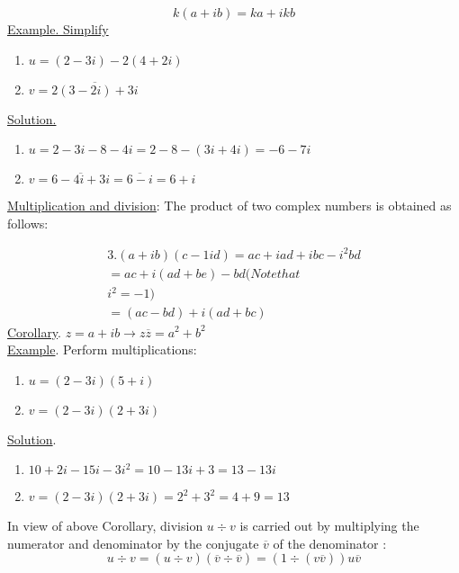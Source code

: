 \documentclass{book}
\begin{document}
\[
    k(a+ib) = ka+ikb
\]
\underline{Example. Simplify}

\begin{enumerate}
    \item 
    
    $    u = (2 - 3i) - 2(4 + 2i)    $
    
    \item
     
    $    v = \overline{2(3 - 2i) + 3i} $
        
\end{enumerate}

\underline{Solution.}

\begin{enumerate}
    \item
    
    $ u = 2 - 3 i - 8 - 4 i = 2 - 8 - ( 3 i + 4 i ) = - 6 - 7 i $
    
    \item
    
    $ v = \overline{6 - 4i + 3i} = \overline{6 - i} = 6 + i $
\end{enumerate}

    \underline{Multiplication and division}: The product of two complex numbers is obtained as follows$\colon $
    
    \begin{align*} 
      3 . ( a + i b ) ( c - 1 id ) = ac + iad + ibc - i^{2}bd 
      \\= ac + i(ad + be) - bd(Note that
      \\i^{2} = -1)
      \\=(ac - bd) + i(ad + bc) 
    \end{align*}
    \underline{Corollary}. $z = a + ib \longrightarrow z\overline{z} = a^{2} + b^{2} $ 
\\    \underline{Example}. Perform multiplications:
\begin{enumerate}
    \item
    
    $u = (2 - 3i)(5 + i)$
    
    \item
    
    $v =(2 - 3i)(2 + 3i)$

\end{enumerate}
    \underline{Solution}.
\begin{enumerate}
    \item
    $ 10 + 2i- 15i- 3i^{2} = 10 - 13i + 3 = 13 - 13i $
    \item   
    $ v = ( 2 - 3 i ) ( 2 + 3 i ) = 2^{2} + 3^{2} = 4 + 9 = 13 $
\end{enumerate}
    In view of above Corollary, division $u\div v $ is carried out by multiplying the numerator and denominator by the conjugate $\overline{v}$ of the denominator $\colon$ 
        \[
        u \div v =( u \div v )(\overline{v} \div \overline{v}) = (1 \div (v \overline{v})) u\overline{v}
        \]
        
\end{document}
